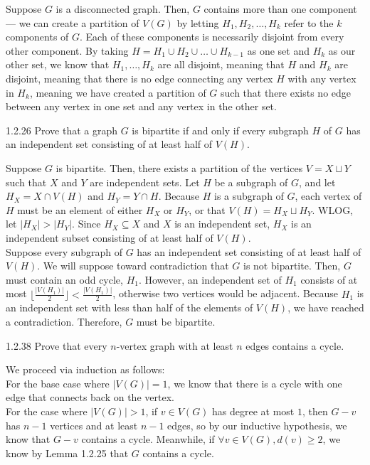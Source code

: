 \documentclass[9pt,twocolumn]{extarticle}
\begin{document}
{\begin{solution}
  Suppose $G$ is a disconnected graph. Then, $G$ contains more than one component --- we can create a partition of $V(G)$ by letting $H_1,H_2,\dots,H_k$ refer to the $k$ components of $G$. Each of these components is necessarily disjoint from every other component. By taking $H = H_1\cup H_2\cup\dots\cup H_{k-1}$ as one set and $H_k$ as our other set, we know that $H_1,\dots,H_k$ are all disjoint, meaning that $H$ and $H_k$ are disjoint, meaning that there is no edge connecting any vertex $H$ with any vertex in $H_k$, meaning we have created a partition of $G$ such that there exists no edge between any vertex in one set and any vertex in the other set.
\end{solution}
\begin{problem}{1.2.26}
  Prove that a graph $G$ is bipartite if and only if every subgraph $H$ of $G$ has an independent set consisting of at least half of $V(H)$.
\end{problem}
\begin{solution}
  Suppose $G$ is bipartite. Then, there exists a partition of the vertices $V = X\sqcup Y$ such that $X$ and $Y$ are independent sets. Let $H$ be a subgraph of $G$, and let $H_X = X\cap V(H)$ and $H_Y = Y\cap H$. Because $H$ is a subgraph of $G$, each vertex of $H$ must be an element of either $H_X$ or $H_Y$, or that $V(H) = H_X \sqcup H_Y$. WLOG, let $|H_X|>|H_Y|$. Since $H_X\subseteq X$ and $X$ is an independent set, $H_X$ is an independent subset consisting of at least half of $V(H)$.\\

  Suppose every subgraph of $G$ has an independent set consisting of at least half of $V(H)$. We will suppose toward contradiction that $G$ is not bipartite. Then, $G$ must contain an odd cycle, $H_1$. However, an independent set of $H_1$ consists of at most $\lfloor \frac{|V(H_1)|}{2}\rfloor < \frac{|V(H_1)|}{2}$, otherwise two vertices would be adjacent. Because $H_1$ is an independent set with less than half of the elements of $V(H)$, we have reached a contradiction. Therefore, $G$ must be bipartite.
\end{solution}
\begin{problem}{1.2.38}
  Prove that every $n$-vertex graph with at least $n$ edges contains a cycle.
\end{problem}
\begin{solution}
  We proceed via induction as follows:\\

  For the base case where $|V(G)| = 1$, we know that there is a cycle with one edge that connects back on the vertex.\\

  For the case where $|V(G)| > 1$, if $v\in V(G)$ has degree at most $1$, then $G-v$ has $n-1$ vertices and at least $n-1$ edges, so by our inductive hypothesis, we know that $G-v$ contains a cycle. Meanwhile, if $\forall v\in V(G), d(v)\geq 2$, we know by Lemma 1.2.25 that $G$ contains a cycle.
\end{solution}
}
\end{document}
